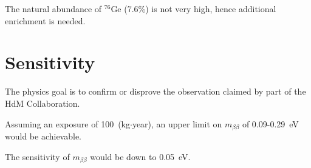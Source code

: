 The natural abundance of $^{76}$Ge (7.6\%) is
not very high, hence additional enrichment is needed.

\section{Sensitivity}
\label{sec:gerda:sens}

The physics goal is to
confirm or disprove the observation claimed by part of the HdM
Collaboration. 

Assuming an exposure of
100~(kg$\cdot$year), an upper limit on $m_{\beta\beta}$ of
0.09-0.29~eV would be achievable. 

 The sensitivity of $m_{\beta\beta}$ would be down to
0.05~eV.


